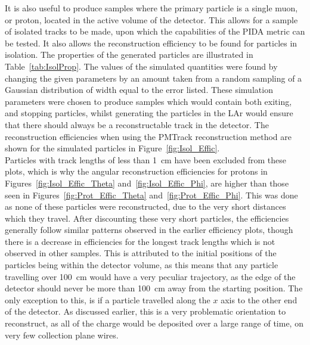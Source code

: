 It is also useful to produce samples where the primary particle is a single muon, or proton, located in the active volume of the detector. This allows for a sample of isolated tracks to be made, upon which the capabilities of the PIDA metric can be tested. It also allows the reconstruction efficiency to be found for particles in isolation. The properties of the generated particles are illustrated in Table~\ref{tab:IsolProp}. The values of the simulated quantities were found by changing the given parameters by an amount taken from a random sampling of a Gaussian distribution of width equal to the error listed. These simulation parameters were chosen to produce samples which would contain both exiting, and stopping particles, whilst generating the particles in the LAr would ensure that there should always be a reconstructable track in the detector. The reconstruction efficiencies when using the PMTrack reconstruction method are shown for the simulated particles in Figure~\ref{fig:Isol_Effic}. \\


Particles with track lengths of less than 1~cm have been excluded from these plots, which is why the angular reconstruction efficiencies for protons in Figures~\ref{fig:Isol_Effic_Theta} and~\ref{fig:Isol_Effic_Phi}, are higher than those seen in Figures~\ref{fig:Prot_Effic_Theta} and~\ref{fig:Prot_Effic_Phi}. This was done as none of these particles were reconstructed, due to the very short distances which they travel. After discounting these very short particles, the efficiencies generally follow similar patterns observed in the earlier efficiency plots, though there is a decrease in efficiencies for the longest track lengths which is not observed in other samples. This is attributed to the initial positions of the particles being within the detector volume, as this means that any particle travelling over 100~cm would have a very peculiar trajectory, as the edge of the detector should never be more than 100~cm away from the starting position. The only exception to this, is if a particle travelled along the $x$ axis to the other end of the detector. As discussed earlier, this is a very problematic orientation to reconstruct, as all of the charge would be deposited over a large range of time, on very few collection plane wires. \\

